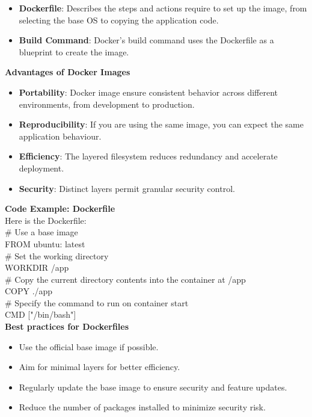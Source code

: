 \documentclass{article}
\begin{document}
\begin{itemize}
\color{blue}
\item \textbf{Dockerfile}: Describes the steps and actions require to set up the image, from selecting the base OS to copying the application code.
\item \textbf{Build Command}: Docker's build command uses the Dockerfile as a blueprint to create the image.
\end{itemize}
\textbf{Advantages of Docker Images} \\
\begin{itemize}
\color{blue}
\item \textbf{Portability}: Docker image ensure consistent behavior across different environments, from development to production.
\item \textbf{Reproducibility}: If you are using the same image, you can expect the same application behaviour.
\item \textbf{Efficiency}: The layered filesystem reduces redundancy and accelerate deployment. 
\item \textbf{Security}: Distinct layers permit granular security control. 
\end{itemize}
\textbf{Code Example: Dockerfile} \\
Here is the Dockerfile: \\


$\#$  Use a base image \\
FROM ubuntu: latest \\

$\#$ Set the working directory \\
WORKDIR /app \\

$\#$ Copy the current directory contents into the container at /app \\
COPY ./app \\

$\#$ Specify the command to run on container start \\
CMD ["/bin/bash"]  \\



\textbf{Best practices for Dockerfiles} \\
\begin{itemize}
\color{blue}
\item Use the official base image if possible.
\item Aim for minimal layers for better efficiency.
\item Regularly update the base image to ensure security and feature updates.
\item Reduce the number of packages installed to minimize security risk.
\end{itemize}
\end{document}
